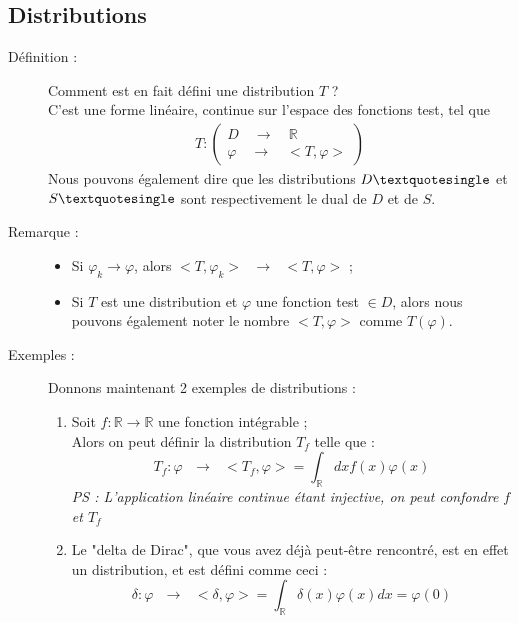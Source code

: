 \documentclass[../notesdecours.tex]{subfiles}
\begin{document}
\subsection{Distributions}
\begin{description}
    \item [Définition :] Comment est en fait défini une distribution $T$ ? \\
    C'est une forme linéaire, continue sur l'espace des fonctions test, tel que 
    \begin{align*}
        T : \left( 
        \begin{array}{lll}
            D \quad \rightarrow \quad \mathbb{R} \\
            \varphi \quad \rightarrow \quad <T, \varphi>
        \end{array} \right)
    \end{align*}
    Nous pouvons également dire que les distributions $D \textquotesingle$ et $S \textquotesingle$ sont respectivement le dual de $D$ et de $S$. \\
    \item [Remarque :]
    \begin{itemize}[label = \textbullet]
        \item Si $\varphi_k \rightarrow \varphi$, alors $<T, \varphi_k> \mbox{ } \rightarrow \mbox{ } <T, \varphi>$ ;
        \item Si $T$ est une distribution et $\varphi$ une fonction test $\in D$, alors nous pouvons également noter le nombre $<T, \varphi>$ comme $T(\varphi)$. 
    \end{itemize}
    \item [Exemples :] Donnons maintenant 2 exemples de distributions : 
    \begin{enumerate}
        \item Soit $f : \mathbb{R} \rightarrow \mathbb{R}$ une fonction intégrable ; \\
        Alors on peut définir la distribution $T_f$ telle que : \\
        \begin{equation}
            T_f : \varphi \mbox{ } \rightarrow \mbox{ } <T_f, \varphi> = \int_{\mathbb{R}} dx f(x) \varphi(x)
        \end{equation}
        \textit{PS : L'application linéaire continue étant injective, on peut confondre $f$ et $T_f$}
        \item Le "delta de Dirac", que vous avez déjà peut-être rencontré, est en effet un distribution, et est défini comme ceci : \\
        \begin{equation}
        \label{delta de dirac}
            \delta : \varphi \mbox{ } \rightarrow \mbox{ } <\delta, \varphi> = \int_{\mathbb{R}} \delta(x) \varphi(x)dx = \varphi(0)
        \end{equation}
        \end{enumerate}
\end{description}
\end{document}
